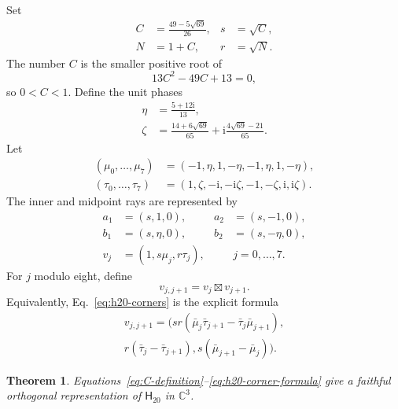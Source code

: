 \documentclass[twocolumn,aps,pra,floatfix,amsmath,amssymb,longbibliography]{revtex4-2}
\newtheorem{theorem}{Theorem}
\theoremstyle{definition}
\theoremstyle{remark}
\newcommand{\ii}{\mathrm{i}}
\newcommand{\C}{\mathbb C}
\newcommand{\Htwenty}{\mathsf H_{20}}
\begin{document}
Set
\begin{equation}
 \begin{aligned}
 C&=\frac{49-5\sqrt{69}}{26},&s&=\sqrt C,\\
 N&=1+C,&r&=\sqrt N.
 \end{aligned}
 \label{eq:C-definition}
\end{equation}
The number $C$ is the smaller positive root of
\begin{equation}
 13C^2-49C+13=0,
 \label{eq:C-polynomial}
\end{equation}
so $0<C<1$.  Define the unit phases
\begin{align}
 \eta&=\frac{5+12\ii}{13},\label{eq:eta}\\
 \zeta&=\frac{14+6\sqrt{69}}{65}
 +\ii\frac{4\sqrt{69}-21}{65}.
 \label{eq:zeta}
\end{align}
Let
\begin{align*}
 (\mu_0,\ldots,\mu_7)&=(-1,\eta,1,-\eta,-1,\eta,1,-\eta),\\
 (\tau_0,\ldots,\tau_7)&=(1,\zeta,-\ii,-\ii\zeta,
 -1,-\zeta,\ii,\ii\zeta).
\end{align*}
The inner and midpoint rays are represented by
\begin{align}
 a_1&=(s,1,0),&a_2&=(s,-1,0),\nonumber\\
 b_1&=(s,\eta,0),&b_2&=(s,-\eta,0),
 \label{eq:h20-inner-vectors}\\
 v_j&=(1,s\mu_j,r\tau_j),&&j=0,\ldots,7.
 \label{eq:h20-midpoints}
\end{align}
For $j$ modulo eight, define
\begin{equation}
 v_{j,j+1}=v_j\boxtimes v_{j+1}.
 \label{eq:h20-corners}
\end{equation}
Equivalently, Eq.~\eqref{eq:h20-corners} is the explicit formula
\begin{multline}
 v_{j,j+1}=\bigl(
 sr(\bar\mu_j\bar\tau_{j+1}-\bar\tau_j\bar\mu_{j+1}),\\
 r(\bar\tau_j-\bar\tau_{j+1}),
 s(\bar\mu_{j+1}-\bar\mu_j)\bigr).
 \label{eq:h20-corner-formula}
\end{multline}

\begin{theorem}
\label{thm:h20-complex}
Equations~\eqref{eq:C-definition}--\eqref{eq:h20-corner-formula}
give a faithful orthogonal representation of $\Htwenty$ in $\C^3$.
\end{theorem}
\end{document}
